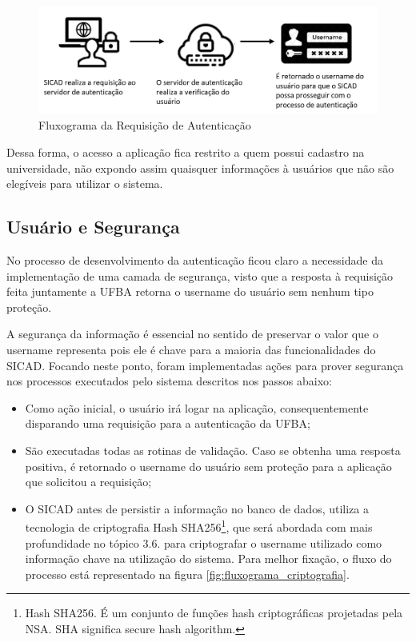 \documentclass[12pt, a4paper]{report}
\begin{document}
\begin{figure}
\centering
\includegraphics[scale=0.50]{processo_autenticacao.jpg}
\caption{Fluxograma da Requisição de Autenticação}
\label{fig:processo_autenticacao}
\end{figure}

Dessa forma, o acesso a aplicação fica restrito a quem possui cadastro na universidade, não expondo assim quaisquer informações à usuários que não são elegíveis para utilizar o sistema.

\subsection{Usuário e Segurança}

No processo de desenvolvimento da autenticação ficou claro a necessidade da implementação de uma camada de segurança, visto que a resposta à requisição feita juntamente a \ac{UFBA} retorna o username do usuário sem nenhum tipo proteção.

A segurança da informação é essencial no sentido de preservar o valor que o username representa pois ele é chave para a maioria das funcionalidades do \ac{SICAD}. Focando neste ponto, foram implementadas ações para prover segurança nos processos executados pelo sistema descritos nos passos abaixo:

\begin{itemize}
\item Como ação inicial, o usuário irá logar na aplicação, consequentemente disparando uma requisição para a autenticação da \ac{UFBA};
\item São executadas todas as rotinas de validação.
Caso se obtenha uma resposta positiva, é retornado o username do usuário sem proteção para a aplicação que solicitou a requisição;
\item O \ac{SICAD} antes de persistir a informação no banco de dados, utiliza a tecnologia de criptografia Hash SHA256\footnote{Hash SHA256. É um conjunto de funções hash criptográficas projetadas pela NSA. SHA significa secure hash algorithm.}, que será abordada com mais profundidade no tópico 3.6. para criptografar o username utilizado como informação chave na utilização do sistema. Para melhor fixação, o fluxo do processo está representado na figura \ref{fig:fluxograma_criptografia}.
\end{itemize}
\end{document}
